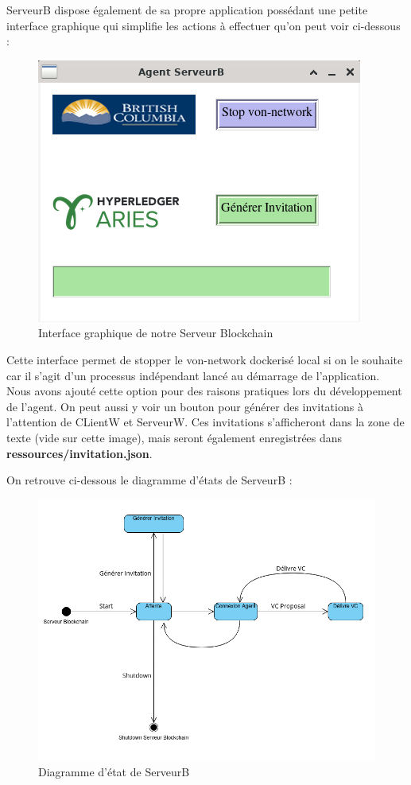 \documentclass[12pt, openany]{report}
\begin{document}
\begin{flushleft}
ServeurB dispose également de sa propre application possédant une petite interface graphique qui simplifie les actions à effectuer qu'on peut voir ci-dessous : 

\begin{figure}[h]
\vspace{2mm}
\includegraphics[scale=0.7]{serveurB.png}
\centering
\caption{Interface graphique de notre Serveur Blockchain}
\end{figure}

Cette interface permet de stopper le von-network dockerisé local si on le souhaite car il s'agit d'un processus indépendant lancé au démarrage de l'application. Nous avons ajouté cette option pour des raisons pratiques lors du développement de l'agent. On peut aussi y voir un bouton pour générer des invitations à l'attention de CLientW et ServeurW. Ces invitations s'afficheront dans la zone de texte (vide sur cette image), mais seront également enregistrées dans \textbf{ressources/invitation.json}.

On retrouve ci-dessous le diagramme d'états de ServeurB :
\begin{figure}[H]
	\includegraphics[scale=0.5]{EtatServeurB.png}
	\centering
	\caption{Diagramme d'état de ServeurB}
\end{figure}

\end{flushleft}
\end{document}
